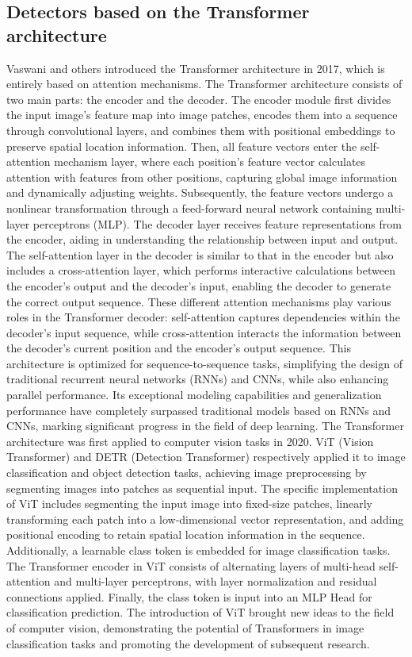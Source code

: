 \documentclass[journal]{IEEEtran}
\begin{document}
\subsection{ Detectors based on the Transformer architecture}
Vaswani and others introduced the Transformer architecture\cite{vaswani2017attention} in 2017, which is entirely based on attention mechanisms. The Transformer architecture consists of two main parts: the encoder and the decoder. The encoder module first divides the input image’s feature map into image patches, encodes them into a sequence through convolutional layers, and combines them with positional embeddings to preserve spatial location information. Then, all feature vectors enter the self-attention mechanism layer, where each position’s feature vector calculates attention with features from other positions, capturing global image information and dynamically adjusting weights. Subsequently, the feature vectors undergo a nonlinear transformation through a feed-forward neural network containing multi-layer perceptrons (MLP). The decoder layer receives feature representations from the encoder, aiding in understanding the relationship between input and output. The self-attention layer in the decoder is similar to that in the encoder but also includes a cross-attention layer, which performs interactive calculations between the encoder’s output and the decoder’s input, enabling the decoder to generate the correct output sequence. These different attention mechanisms play various roles in the Transformer decoder: self-attention captures dependencies within the decoder’s input sequence, while cross-attention interacts the information between the decoder’s current position and the encoder’s output sequence.
This architecture is optimized for sequence-to-sequence tasks, simplifying the design of traditional recurrent neural networks (RNNs)\cite{medsker2001recurrent} and CNNs, while also enhancing parallel performance. Its exceptional modeling capabilities and generalization performance have completely surpassed traditional models based on RNNs and CNNs, marking significant progress in the field of deep learning.
The Transformer architecture was first applied to computer vision tasks in 2020. ViT\cite{dosovitskiy2020image} (Vision Transformer) and DETR\cite{carion2020end} (Detection Transformer) respectively applied it to image classification and object detection tasks, achieving image preprocessing by segmenting images into patches as sequential input. The specific implementation of ViT includes segmenting the input image into fixed-size patches, linearly transforming each patch into a low-dimensional vector representation, and adding positional encoding to retain spatial location information in the sequence. Additionally, a learnable class token is embedded for image classification tasks. The Transformer encoder in ViT consists of alternating layers of multi-head self-attention and multi-layer perceptrons, with layer normalization and residual connections applied. Finally, the class token is input into an MLP Head for classification prediction. The introduction of ViT brought new ideas to the field of computer vision, demonstrating the potential of Transformers in image classification tasks and promoting the development of subsequent research.
\end{document}
